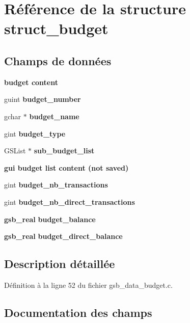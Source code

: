 \section{Référence de la structure struct\_\-budget}
\label{structstruct__budget}
\subsection*{Champs de données}
\begin{Indent}{\bf budget content}\par
{\em \label{_amgrpc3274666feb5137488a1fd1983212a51}
 }\begin{DoxyCompactItemize}
\item 
guint {\bf budget\_\-number}
\item 
gchar $\ast$ {\bf budget\_\-name}
\item 
gint {\bf budget\_\-type}
\item 
GSList $\ast$ {\bf sub\_\-budget\_\-list}
\end{DoxyCompactItemize}
\end{Indent}
\begin{Indent}{\bf gui budget list content (not saved)}\par
{\em \label{_amgrp756a41c8215f5bc279b61d5f9cb0d429}
 }\begin{DoxyCompactItemize}
\item 
gint {\bf budget\_\-nb\_\-transactions}
\item 
gint {\bf budget\_\-nb\_\-direct\_\-transactions}
\item 
{\bf gsb\_\-real} {\bf budget\_\-balance}
\item 
{\bf gsb\_\-real} {\bf budget\_\-direct\_\-balance}
\end{DoxyCompactItemize}
\end{Indent}


\subsection{Description détaillée}


Définition à la ligne 52 du fichier gsb\_\-data\_\-budget.c.



\subsection{Documentation des champs}
